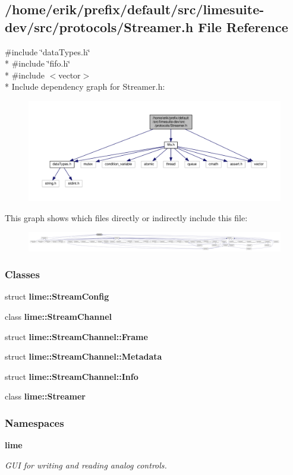 \subsection{/home/erik/prefix/default/src/limesuite-\/dev/src/protocols/\+Streamer.h File Reference}
\label{Streamer_8h}
{\ttfamily \#include \char`\"{}data\+Types.\+h\char`\"{}}\\*
{\ttfamily \#include \char`\"{}fifo.\+h\char`\"{}}\\*
{\ttfamily \#include $<$vector$>$}\\*
Include dependency graph for Streamer.\+h\+:
\nopagebreak
\begin{figure}[H]
\begin{center}
\leavevmode
\includegraphics[width=350pt]{db/d74/Streamer_8h__incl}
\end{center}
\end{figure}
This graph shows which files directly or indirectly include this file\+:
\nopagebreak
\begin{figure}[H]
\begin{center}
\leavevmode
\includegraphics[width=350pt]{d0/de1/Streamer_8h__dep__incl}
\end{center}
\end{figure}
\subsubsection*{Classes}
\begin{DoxyCompactItemize}
\item 
struct {\bf lime\+::\+Stream\+Config}
\item 
class {\bf lime\+::\+Stream\+Channel}
\item 
struct {\bf lime\+::\+Stream\+Channel\+::\+Frame}
\item 
struct {\bf lime\+::\+Stream\+Channel\+::\+Metadata}
\item 
struct {\bf lime\+::\+Stream\+Channel\+::\+Info}
\item 
class {\bf lime\+::\+Streamer}
\end{DoxyCompactItemize}
\subsubsection*{Namespaces}
\begin{DoxyCompactItemize}
\item 
 {\bf lime}
\begin{DoxyCompactList}\small\item\em G\+UI for writing and reading analog controls. \end{DoxyCompactList}\end{DoxyCompactItemize}
